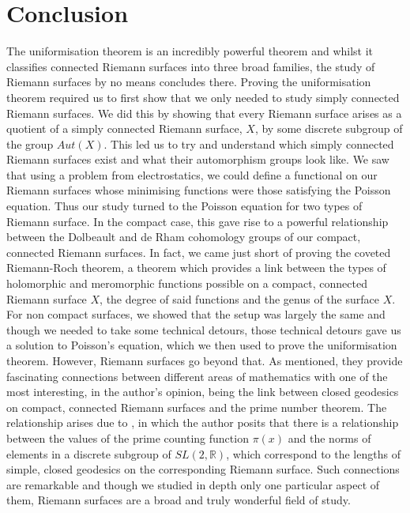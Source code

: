 \documentclass[11pt]{report}
\theoremstyle{definition}
\begin{document}
\chapter*{Conclusion}
The uniformisation theorem is an incredibly powerful theorem and whilst it classifies connected Riemann surfaces into three broad families, the study of Riemann surfaces by no means concludes there. Proving the uniformisation theorem required us to first show that we only needed to study simply connected Riemann surfaces. We did this by showing that every Riemann surface arises as a quotient of a simply connected Riemann surface, $X$, by some discrete subgroup of the group $Aut(X)$. This led us to try and understand which simply connected Riemann surfaces exist and what their automorphism groups look like. We saw that using a problem from electrostatics, we could define a functional on our Riemann surfaces whose minimising functions were those satisfying the Poisson equation. Thus our study turned to the Poisson equation for two types of Riemann surface. In the compact case, this gave rise to a powerful relationship between the Dolbeault and de Rham cohomology groups of our compact, connected Riemann surfaces. In fact, we came just short of proving the coveted Riemann-Roch theorem, a theorem which provides a link between the types of holomorphic and meromorphic functions possible on a compact, connected Riemann surface $X$, the degree of said functions and the genus of the surface $X$. For non compact surfaces, we showed that the setup was largely the same and though we needed to take some technical detours, those technical detours gave us a solution to Poisson's equation, which we then used to prove the uniformisation theorem. However, Riemann surfaces go beyond that. As mentioned, they provide fascinating connections between different areas of mathematics with one of the most interesting, in the author's opinion, being the link between closed geodesics on compact, connected Riemann surfaces and the prime number theorem. The relationship arises due to \cite{selb}, in which the author posits that there is a relationship between the values of the prime counting function $\pi(x)$ and the norms of elements in a discrete subgroup of $SL(2,\mathbb{R})$, which correspond to the lengths of simple, closed geodesics on the corresponding Riemann surface. Such connections are remarkable and though we studied in depth only one particular aspect of them, Riemann surfaces are a broad and truly wonderful field of study.
\end{document}
